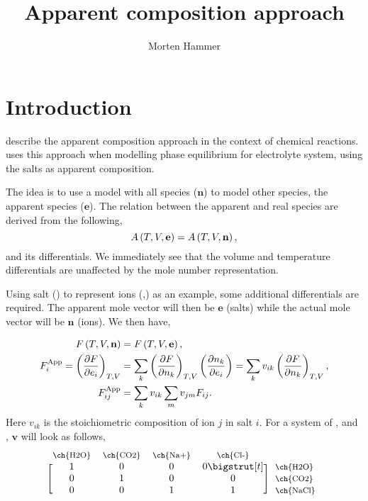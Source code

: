 \documentclass[internal,english]{sintefmemo2012}
\title{Apparent composition approach}
\author{Morten Hammer}
\newcommand*{\pder}[2]{\left(\frac{\partial #1}{\partial #2}\right)}
\newcommand*{\pdersub}[3]{\left(\frac{\partial #1}{\partial #2}\right)_{#3}}
\newcommand*{\vektor}[1]{\boldsymbol{#1}}%
\newcommand{\lp}{\ensuremath{\left(}\xspace}
\newcommand{\rp}{\ensuremath{\right)}\xspace}
\newcommand{\mbn}[0]{\mathbf n}
\newcommand{\mbe}[0]{\mathbf e}
\newcommand{\app}{\ensuremath{\text{App}}\xspace}
\begin{document}
\frontmatter
\tableofcontents
\section{Introduction}
\citet[Chap. 13, Sec. 7]{Michelsen2007} describe the apparent
composition approach in the context of chemical
reactions. \citet[App. C.3]{Mogensen2014} uses this approach when
modelling phase equilibrium for electrolyte system, using the salts as
apparent composition.

The idea is to use a model with all species ($\vektor{n}$) to model
other species, the apparent species ($\vektor{e}$). The relation
between the apparent and real species are derived from the following,
\begin{equation}
  A\lp T, V, \mbe \rp = A\lp T, V, \mbn \rp,
\label{eq:helmholtz}
\end{equation}
and its differentials. We immediately see that the volume and
temperature differentials are unaffected by the mole number
representation.

Using salt () to represent ions (,) as an
example, some additional differentials are required. The apparent mole
vector will then be $\mbe$ (salts) while the actual mole vector will
be $\mbn$ (ions). We then have,

\begin{align}
  F\lp T, V, \mbn \rp &= F\lp T, V, \mbe \rp,\\
  F_i^\app = \pdersub{F}{e_i}{T,V} &=
  \sum_k\pdersub{F}{n_k}{T,V}\pder{n_k}{e_i}
  = \sum_k v_{ik} \pdersub{F}{n_k}{T,V},\\
  F_{ij}^\app &
  = \sum_k v_{ik} \sum_m v_{jm} F_{ij}.
\end{align}
Here $v_{ik}$ is the stoichiometric composition of ion $j$ in salt
$i$. For a system of ,  and , $\mathbf{v}$
will look as follows,
\begin{equation}
  \begin{blockarray}{*{4}{c} l}
    \begin{block}{*{4}{>{$\footnotesize}c<{$}} l}
      \ch{H2O} & \ch{CO2} & \ch{Na+} & \ch{Cl-} & \\
    \end{block}
    \begin{block}{[*{4}{c}]>{$\footnotesize}l<{$}}
      1 & 0 & 0 & 0  \bigstrut[t] & \ch{H2O} \\
      0 & 1 & 0 & 0 & \ch{CO2} \\
      0 & 0 & 1 & 1 & \ch{NaCl} \\
    \end{block}
  \end{blockarray}
\end{equation}
\end{document}
